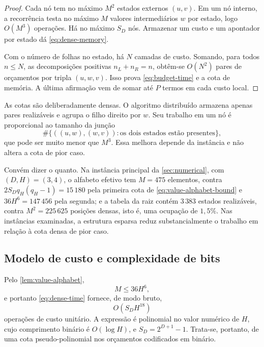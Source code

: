 \begin{proof}
Cada nó tem no máximo $M^2$ estados externos $(u,v)$. Em um nó interno, a
recorrência testa no máximo $M$ valores intermediários $w$ por estado, logo
$O(M^3)$ operações. Há no máximo $S_D$ nós. Armazenar um custo e um apontador
por estado dá \eqref{eq:dense-memory}.

Com o número de folhas no estado, há $N$ camadas de custo. Somando, para todos
$n\le N$, as decomposições positivas $n_L+n_R=n$, obtêm-se $O(N^2)$ pares de
orçamentos por tripla $(u,w,v)$. Isso prova \eqref{eq:budget-time} e a cota de
memória. A última afirmação vem de somar até $P$ termos em cada custo local.
\end{proof}

\begin{remark}
\label{rem:sparse}
As cotas são deliberadamente densas. O algoritmo distribuído armazena apenas
pares realizáveis e agrupa o filho direito por $w$. Seu trabalho em um nó é
proporcional ao tamanho da junção
\[
 \#\{((u,w),(w,v)):\text{os dois estados estão presentes}\},
\]
que pode ser muito menor que $M^3$. Essa melhora depende da instância e não
altera a cota de pior caso.

Convém dizer o quanto. Na instância principal da \cref{sec:numerical}, com
$(D,H)=(3,4)$, o alfabeto efetivo tem $M=475$ elementos, contra
$2S_Dq_H(q_H-1)=15\,180$ pela primeira cota de
\eqref{eq:value-alphabet-bound} e $36H^6=147\,456$ pela segunda; e a tabela da
raiz contém $3\,383$ estados realizáveis, contra $M^2=225\,625$ posições
densas, isto é, uma ocupação de $1{,}5\%$. Nas instâncias examinadas, a
estrutura esparsa reduz substancialmente o trabalho em relação à cota densa de
pior caso.
\end{remark}

\subsection{Modelo de custo e complexidade de bits}

Pelo \cref{lem:value-alphabet},
\[
 M\le36H^6,
\]
e portanto \eqref{eq:dense-time} fornece, de modo bruto,
\begin{equation}
 O(S_DH^{18})
 \label{eq:height-worst}
\end{equation}
operações de custo unitário. A expressão é polinomial no valor numérico de
$H$, cujo comprimento binário é $O(\log H)$, e
$S_D=2^{D+1}-1$. Trata-se, portanto, de uma cota pseudo-polinomial nos
orçamentos codificados em binário.

